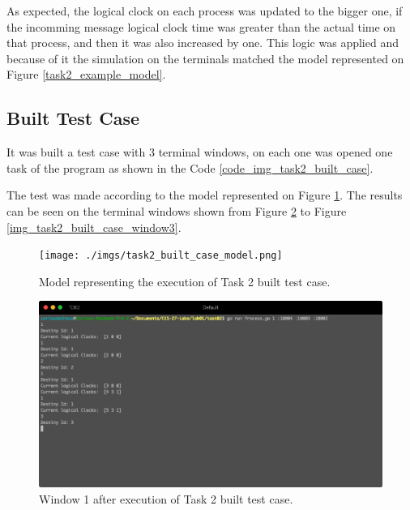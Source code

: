 \documentclass[a4paper, 11pt]{article}
\begin{document}
As expected, the logical clock on each process was updated to the bigger one, if the incomming message logical clock time was greater than the actual time on that process, and then it was also increased by one. This logic was applied and because of it the simulation on the terminals matched the model represented on Figure \ref{task2_example_model}.

\subsection*{Built Test Case}

It was built a test case with 3 terminal windows, on each one was opened one task of the program as shown in the Code \ref{code_img_task2_built_case}.

The test was made according to the model represented on Figure \ref{img_task2_built_case_model}. The results can be seen on the terminal windows shown from Figure \ref{img_task2_built_case_window1} to Figure \ref{img_task2_built_case_window3}.

\begin{figure}[h]
  \begin{center}
  \texttt{[image: ./imgs/task2\_built\_case\_model.png]}
  \caption{Model representing the execution of Task 2 built test case.}
  \label{img_task2_built_case_model}
  \end{center}
\end{figure}



\begin{figure}[h]
  \begin{center}
  \includegraphics[width=4.5in]{./imgs/task2_buit_test_window1.png}
  \caption{Window 1 after execution of Task 2 built test case.}
  \label{img_task2_built_case_window1}
  \end{center}
\end{figure}
\end{document}
